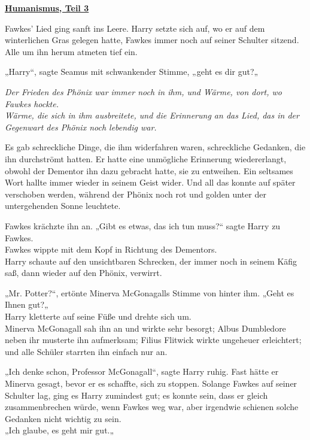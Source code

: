 

\hypertarget{humanismus-teil-3}{%

\textbf{\uline{Humanismus, Teil 3}}

\hfill\break Fawkes' Lied ging sanft ins Leere. Harry setzte sich auf, wo er auf dem winterlichen Gras gelegen hatte, Fawkes immer noch auf seiner Schulter sitzend. Alle um ihn herum atmeten tief ein.

„Harry“, sagte Seamus mit schwankender Stimme, „geht es dir gut?„

\emph{Der Frieden des Phönix war immer noch in ihm, und Wärme, von dort, wo Fawkes hockte.\\ Wärme, die sich in ihm ausbreitete, und die Erinnerung an das Lied, das in der Gegenwart des Phönix noch lebendig war.}

Es gab schreckliche Dinge, die ihm widerfahren waren, schreckliche Gedanken, die ihn durchströmt hatten. Er hatte eine unmögliche Erinnerung wiedererlangt, obwohl der Dementor ihn dazu gebracht hatte, sie zu entweihen. Ein seltsames Wort hallte immer wieder in seinem Geist wider. Und all das konnte auf später verschoben werden, während der Phönix noch rot und golden unter der untergehenden Sonne leuchtete.

Fawkes krächzte ihn an. „Gibt es etwas, das ich tun muss?“ sagte Harry zu Fawkes.\\ Fawkes wippte mit dem Kopf in Richtung des Dementors.\\ Harry schaute auf den unsichtbaren Schrecken, der immer noch in seinem Käfig saß, dann wieder auf den Phönix, verwirrt.

„Mr. Potter?“, ertönte Minerva McGonagalls Stimme von hinter ihm. „Geht es Ihnen gut?„\\ Harry kletterte auf seine Füße und drehte sich um.\\ Minerva McGonagall sah ihn an und wirkte sehr besorgt; Albus Dumbledore neben ihr musterte ihn aufmerksam; Filius Flitwick wirkte ungeheuer erleichtert; und alle Schüler starrten ihn einfach nur an.

„Ich denke schon, Professor McGonagall“, sagte Harry ruhig. Fast hätte er Minerva gesagt, bevor er es schaffte, sich zu stoppen. Solange Fawkes auf seiner Schulter lag, ging es Harry zumindest gut; es konnte sein, dass er gleich zusammenbrechen würde, wenn Fawkes weg war, aber irgendwie schienen solche Gedanken nicht wichtig zu sein.\\ „Ich glaube, es geht mir gut.„

}
